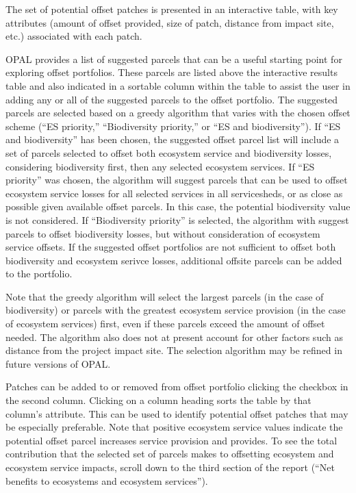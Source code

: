 \documentclass[11pt,letterpaper]{report}
\newenvironment{myenumerate}{%
	\edef\backupindent{\the\parindent}
	\enumerate
	\setlength{\parindent}{\backupindent}
		\setlist[enumerate,1]{label=(\arabic*)}
		\setlist[enumerate,2]{label=(\arabic*)}
}{\endenumerate}
\begin{document}
\begin{myenumerate}
			The set of potential offset patches is presented in an interactive table, with key attributes (amount of offset provided, size of patch, distance from impact site, etc.) associated with each patch.
	
			OPAL provides a list of suggested parcels that can be a useful starting point for exploring offset portfolios. These parcels are listed above the interactive results table and also indicated in a sortable column within the table to assist the user in adding any or all of the suggested parcels to the offset portfolio. The suggested parcels are selected based on a greedy  algorithm that varies with the chosen offset scheme (``ES priority,'' ``Biodiversity priority,'' or ``ES and biodiversity''). If ``ES and biodiversity'' has been chosen, the suggested offset parcel list will include a set of parcels selected to offset both ecosystem service and biodiversity losses, considering biodiversity first, then any selected ecosystem services. If ``ES priority'' was chosen, the algorithm will suggest parcels that can be used to offset ecosystem service losses for all selected services in all servicesheds, or as close as possible given available offset parcels. In this case, the potential biodiversity value is not considered. If ``Biodiversity priority'' is selected, the algorithm with suggest parcels to offset biodiversity losses, but without consideration of ecosystem service offsets. If the suggested offset portfolios are not sufficient to offset both biodiversity and ecosystem serivce losses, additional offsite parcels can be added to the portfolio.
			
			Note that the greedy algorithm will select the largest parcels (in the case of biodiversity) or parcels with the greatest ecosystem service provision (in the case of ecosystem services) first, even if these parcels exceed the amount of offset needed. The algorithm also does not at present account for other factors such as distance from the project impact site. The selection algorithm may be refined in future versions of OPAL.
			
			Patches can be added to or removed from offset portfolio clicking the checkbox in the second column. Clicking on a column heading sorts the table by that column's attribute. This can be used to identify potential offset patches that may be especially preferable. Note that positive ecosystem service values indicate the potential offset parcel increases service provision and provides. To see the total contribution that the selected set of parcels makes to offsetting ecosystem and ecosystem service impacts, scroll down to the third section of the report (``Net benefits to ecosystems and ecosystem services'').
			

\end{myenumerate}
\end{document}
